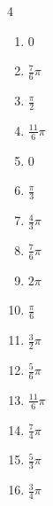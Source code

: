 \begin{multicols}{4}
\begin{enumerate}
  \item $\displaystyle 0$

  \item $\displaystyle \frac{7}{6}\pi$

  \item $\displaystyle \frac{\pi}{2}$

  \item $\displaystyle \frac{11}{6}\pi$

  \item $\displaystyle 0$

  \item $\displaystyle \frac{\pi}{3}$

  \item $\displaystyle \frac{4}{3}\pi$

  \item $\displaystyle \frac{7}{6}\pi$

  \item $\displaystyle 2\pi$

  \item $\displaystyle \frac{\pi}{6}$

  \item $\displaystyle \frac{3}{2}\pi$

  \item $\displaystyle \frac{5}{6}\pi$

  \item $\displaystyle \frac{11}{6}\pi$

  \item $\displaystyle \frac{7}{4}\pi$

\columnbreak %

  \item $\displaystyle \frac{5}{3}\pi$

  \item $\displaystyle \frac{3}{4}\pi$


\end{enumerate}
\end{multicols}
